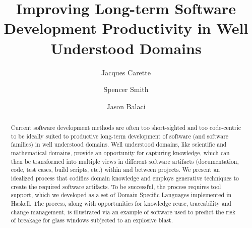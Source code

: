 \documentclass[sigconf,review]{acmart}
\begin{document}
\title{Improving Long-term Software Development Productivity in Well Understood Domains}

\author{Jacques Carette}

\author{Spencer Smith}

\author{Jason Balaci}

\begin{abstract}
  Current software development methods are often too short-sighted and too
  code-centric to be ideally suited to productive long-term development of
  software (and software families) in well understood domains.  Well understood
  domains, like scientific and mathematical domains, provide an opportunity for
  capturing knowledge, which can then be transformed into multiple views in
  different software artifacts (documentation, code, test cases, build scripts,
  etc.) within and between projects.  %
  We present an idealized process that codifies domain knowledge and employs
  generative techniques to create the required software artifacts.  To be
  successful, the process requires tool support, which we developed as a set of
  Domain Specific Languages implemented in Haskell.  The process, along with
  opportunities for knowledge reuse, traceability and change management, is
  illustrated via an example of software used to predict the risk of breakage
  for glass windows subjected to an explosive blast.
\end{abstract}
\end{document}
